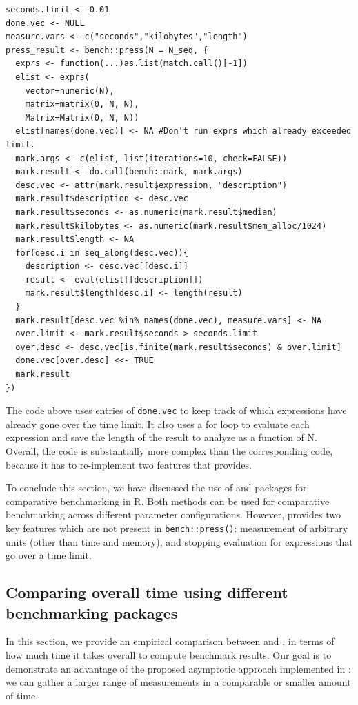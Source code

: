 \begin{Schunk}
    \begin{verbatim}
seconds.limit <- 0.01
done.vec <- NULL
measure.vars <- c("seconds","kilobytes","length")
press_result <- bench::press(N = N_seq, {
  exprs <- function(...)as.list(match.call()[-1])
  elist <- exprs(
    vector=numeric(N),
    matrix=matrix(0, N, N),
    Matrix=Matrix(0, N, N))
  elist[names(done.vec)] <- NA #Don't run exprs which already exceeded limit.
  mark.args <- c(elist, list(iterations=10, check=FALSE))
  mark.result <- do.call(bench::mark, mark.args)
  desc.vec <- attr(mark.result$expression, "description")
  mark.result$description <- desc.vec
  mark.result$seconds <- as.numeric(mark.result$median)
  mark.result$kilobytes <- as.numeric(mark.result$mem_alloc/1024)
  mark.result$length <- NA
  for(desc.i in seq_along(desc.vec)){
    description <- desc.vec[[desc.i]]
    result <- eval(elist[[description]])
    mark.result$length[desc.i] <- length(result)
  }
  mark.result[desc.vec %in% names(done.vec), measure.vars] <- NA
  over.limit <- mark.result$seconds > seconds.limit
  over.desc <- desc.vec[is.finite(mark.result$seconds) & over.limit]
  done.vec[over.desc] <<- TRUE
  mark.result
})
    \end{verbatim}
\end{Schunk}
The code above uses entries of \verb|done.vec| to keep track of which expressions have already gone over the time limit.
It also uses a for loop to evaluate each expression and save the length of the result to analyze as a function of N.
Overall, the code is substantially more complex than the corresponding  code, because it has to re-implement two features that  provides.

To conclude this section, we have discussed the use of  and  packages for comparative benchmarking in R. 
Both methods can be used for comparative benchmarking across different parameter configurations. 
However,  provides two key features which are not present in \verb|bench::press()|: measurement of arbitrary units (other than time and memory), and stopping evaluation for expressions that go over a time limit.

\subsection{Comparing overall time using different benchmarking packages}

In this section, we provide an empirical comparison between  and , in terms of how much time it takes overall to compute benchmark results.
Our goal is to demonstrate an advantage of the proposed asymptotic approach implemented in : we can gather a larger range of measurements in a comparable or smaller amount of time.

